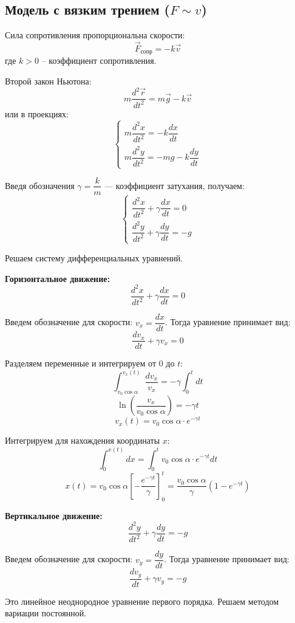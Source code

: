 \begin{center}
    \subsection{Модель с вязким трением ($F \sim v$)}
\end{center}
    
Сила сопротивления пропорциональна скорости:
\[
\vec{F}_{\text{сопр}} = -k\vec{v}
\]
где $k > 0$ -- коэффициент сопротивления.

Второй закон Ньютона:
\[
m\dfrac{d^2\vec{r}}{dt^2} = m\vec{g} - k\vec{v}
\]
или в проекциях:
\[
\begin{cases}
m\dfrac{d^2x}{dt^2} = -k\dfrac{dx}{dt} \\[1em]
m\dfrac{d^2y}{dt^2} = -mg - k\dfrac{dy}{dt}
\end{cases}
\]

Введя обозначения $\gamma = \dfrac{k}{m}$ --- коэффициент затухания, получаем:
\[
\begin{cases}
\dfrac{d^2x}{dt^2} + \gamma \dfrac{dx}{dt} = 0 \\[1em]
\dfrac{d^2y}{dt^2} + \gamma \dfrac{dy}{dt} = -g
\end{cases}
\]

\Solution Решаем систему дифференциальных уравнений.

\textbf{Горизонтальное движение:}
\[
\dfrac{d^2x}{dt^2} + \gamma \dfrac{dx}{dt} = 0
\]

Введем обозначение для скорости: $v_x = \dfrac{dx}{dt}$. Тогда уравнение принимает вид:
\[
\dfrac{dv_x}{dt} + \gamma v_x = 0
\]

Разделяем переменные и интегрируем от 0 до $t$:
\[
\int_{v_0 \cos\alpha}^{v_x(t)} \dfrac{dv_x}{v_x} = -\gamma \int_0^t dt
\]
\[
\ln\left(\dfrac{v_x}{v_0 \cos\alpha}\right) = -\gamma t
\]
\[
v_x(t) = v_0 \cos\alpha \cdot e^{-\gamma t}
\]

Интегрируем для нахождения координаты $x$:
\[
\int_0^{x(t)} dx = \int_0^t v_0 \cos\alpha \cdot e^{-\gamma t} dt
\]
\[
x(t) = v_0 \cos\alpha \left[-\dfrac{e^{-\gamma t}}{\gamma}\right]_0^t = \dfrac{v_0 \cos\alpha}{\gamma}(1 - e^{-\gamma t})
\]

\vspace{0.5cm}
\textbf{Вертикальное движение:}
\[
\dfrac{d^2y}{dt^2} + \gamma \dfrac{dy}{dt} = -g
\]

Введем обозначение для скорости: $v_y = \dfrac{dy}{dt}$. Тогда уравнение принимает вид:
\[
\dfrac{dv_y}{dt} + \gamma v_y = -g
\]

Это линейное неоднородное уравнение первого порядка. Решаем методом вариации постоянной.

